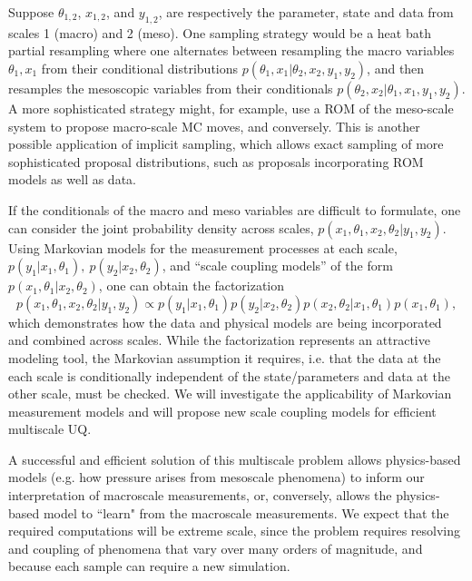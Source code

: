 \documentclass[11pt]{article}
\begin{document}
Suppose $\theta_{1,2}$, $x_{1,2}$, and $y_{1,2}$, are respectively the parameter, state and data 
from scales 1 (macro) and 2 (meso).
One sampling strategy would be a heat bath partial resampling where one alternates between
resampling the macro variables $\theta_1,x_1$ from their conditional distributions 
$p(\theta_1,x_1|\theta_2,x_2,y_1,y_2)$, and then resamples the mesoscopic variables from their
conditionals $p(\theta_2,x_2|\theta_1,x_1,y_1,y_2)$.
A more sophisticated strategy might, for example, use a ROM of the meso-scale system to propose
macro-scale MC moves, and conversely.
This is another possible application of implicit sampling, which allows exact sampling of more
sophisticated proposal distributions, such as proposals incorporating ROM models as well as data.

If the conditionals of the macro and meso variables are difficult to formulate, one can consider the joint probability density across scales, $p(x_1,\theta_1,x_2,\theta_2|y_1,y_2)$. Using Markovian models for the measurement processes at each scale, $p(y_1|x_1,\theta_1),\ p(y_2|x_2,\theta_2)$, and ``scale coupling models'' of the form $p(x_1,\theta_1|x_2,\theta_2)$, one can obtain the factorization
\begin{equation}
	p(x_1,\theta_1,x_2,\theta_2|y_1,y_2) \propto p(y_1|x_1,\theta_1) p(y_2|x_2,\theta_2)p(x_2,\theta_2|x_1,\theta_1)p(x_1,\theta_1),
\end{equation}
which demonstrates how the data and physical models are being incorporated and combined across scales. While the factorization represents an attractive modeling tool, the Markovian assumption it requires, i.e. that the data at the each scale is conditionally independent of the state\slash parameters and data at the other scale, must be checked. We will investigate the applicability of Markovian measurement models and will propose new scale coupling models for efficient multiscale UQ.

A successful and efficient solution of this multiscale problem allows physics-based models (e.g. how pressure arises from mesoscale phenomena) to inform our interpretation of macroscale measurements, or, conversely, allows the physics-based model to ``learn" from the macroscale measurements.
We expect that the required computations will be extreme scale, since the problem requires resolving and coupling of phenomena that vary over many orders of magnitude,
and because each sample can require a new simulation.
\end{document}

